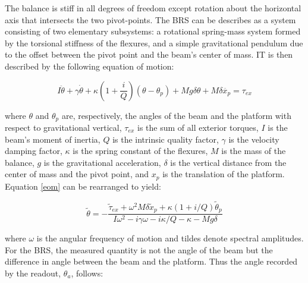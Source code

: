 \documentclass [12pt, proquest]{uwthesis}[2019]
\begin{document}
The balance is stiff in all degrees of freedom except rotation about the horizontal axis that intersects the two pivot-points. The BRS can be describes as a system consisting of two elementary subsystems: a rotational spring-mass system formed by the torsional stiffness of the flexures, and a simple gravitational pendulum due to the offset between the pivot point and the beam's center of mass. IT is then described by the following equation of motion: \cite{venk2014}

\begin{equation}
I \ddot{\theta}+ \gamma \dot{\theta}+\kappa (1+ \frac{i}{Q})(\theta-\theta_p)+M g \delta \theta +M \delta \ddot{x_p}=\tau_{ex} \label{eom}
\end{equation}

where $\theta$ and $\theta_p$ are, respectively, the angles of the beam and the platform with respect to gravitational vertical, $\tau_{ex}$ is the sum of all exterior torques, $I$ is the beam's moment of inertia, $Q$ is the intrinsic quality factor, $\gamma$ is the velocity damping factor, $\kappa$ is the spring constant of the flexures, $M$ is the mass of the balance, $g$ is the gravitational acceleration, $\delta$ is the vertical distance from the center of mass and the pivot point, and $x_p$ is the translation of the platform. Equation \ref{eom} can be rearranged to yield:

\begin{equation}
\tilde{\theta} = -\frac{\tilde{\tau}_{ex}+\omega^2 M \delta \tilde{x}_p+\kappa (1+i/Q) \tilde{\theta}_p}{I\omega^2-i \gamma \omega -i \kappa /Q-\kappa -Mg\delta}
\end{equation}

where $\omega$ is the angular frequency of motion and tildes denote spectral amplitudes. For the BRS, the measured quantity is not the angle of the beam but the difference in angle between the beam and the platform. Thus the angle recorded by the readout, $\theta_a$, follows:
\end{document}
